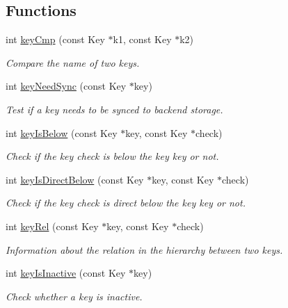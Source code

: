 \subsection*{Functions}
\begin{DoxyCompactItemize}
\item 
int \hyperlink{group__keytest_gaf6e66e12fe04d535a5d1c8218ced803e}{key\+Cmp} (const Key $\ast$k1, const Key $\ast$k2)
\begin{DoxyCompactList}\small\item\em Compare the name of two keys. \end{DoxyCompactList}\item 
int \hyperlink{group__keytest_gaf247df0de7aca04b32ef80e39ef12950}{key\+Need\+Sync} (const Key $\ast$key)
\begin{DoxyCompactList}\small\item\em Test if a key needs to be synced to backend storage. \end{DoxyCompactList}\item 
int \hyperlink{group__keytest_ga03332b5d97c76a4fd2640aca4762b8df}{key\+Is\+Below} (const Key $\ast$key, const Key $\ast$check)
\begin{DoxyCompactList}\small\item\em Check if the key check is below the key key or not. \end{DoxyCompactList}\item 
int \hyperlink{group__keytest_ga4f175aafd98948ce6c774f3bd92b72ca}{key\+Is\+Direct\+Below} (const Key $\ast$key, const Key $\ast$check)
\begin{DoxyCompactList}\small\item\em Check if the key check is direct below the key key or not. \end{DoxyCompactList}\item 
int \hyperlink{group__keytest_ga6bb0f95ac34ce9c42d61bb35a76139d0}{key\+Rel} (const Key $\ast$key, const Key $\ast$check)
\begin{DoxyCompactList}\small\item\em Information about the relation in the hierarchy between two keys. \end{DoxyCompactList}\item 
int \hyperlink{group__keytest_gaa25f699f592031c1a0abc1504d14e13e}{key\+Is\+Inactive} (const Key $\ast$key)
\begin{DoxyCompactList}\small\item\em Check whether a key is inactive. \end{DoxyCompactList}\item 

\end{DoxyCompactItemize}
